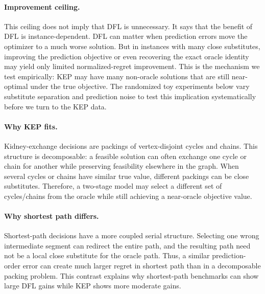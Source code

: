 \paragraph{Improvement ceiling.}
This ceiling does not imply that DFL is unnecessary. It says that the benefit of
DFL is instance-dependent. DFL can matter when prediction errors move the
optimizer to a much worse solution. But in instances with many close
substitutes, improving the prediction objective or even recovering the exact
oracle identity may yield only limited normalized-regret improvement. This is
the mechanism we test empirically: KEP may have many non-oracle solutions that
are still near-optimal under the true objective.
The randomized toy experiments below vary substitute separation and prediction
noise to test this implication systematically before we turn to the KEP data.

\paragraph{Why KEP fits.}
Kidney-exchange decisions are packings of vertex-disjoint cycles and chains.
This structure is decomposable: a feasible solution can often exchange one
cycle or chain for another while preserving feasibility elsewhere in the graph.
When several cycles or chains have similar true value, different packings can
be close substitutes. Therefore, a two-stage model may select a different set of
cycles/chains from the oracle while still achieving a near-oracle objective
value.

\paragraph{Why shortest path differs.}
Shortest-path decisions have a more coupled serial structure. Selecting one
wrong intermediate segment can redirect the entire path, and the resulting path
need not be a local close substitute for the oracle path. Thus, a similar
prediction-order error can create much larger regret in shortest path than in a
decomposable packing problem. This contrast explains why shortest-path
benchmarks can show large DFL gains while KEP shows more moderate gains.
